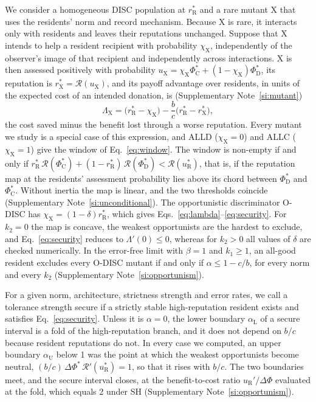 \documentclass[10pt]{wlscirep}
\newcommand{\Rmap}{\mathscr{R}}            %
\newcommand{\rR}{r_{\mathrm{R}}^{*}}
\newcommand{\uR}{u_{\mathrm{R}}^{*}}
\newcommand{\rX}{r_{\mathrm{X}}^{*}}
\newcommand{\uX}{u_{\mathrm{X}}}
\newcommand{\PhiCs}{\Phi^{*}_{\mathrm{C}}}
\newcommand{\PhiDs}{\Phi^{*}_{\mathrm{D}}}
\newcommand{\dPhi}{\Delta\Phi^{*}}
\theoremstyle{plain}
\theoremstyle{remark}
\begin{document}
We consider a homogeneous DISC population at $\rR$ and a rare mutant X that uses the residents' norm and record mechanism. Because X is rare, it interacts only with residents and leaves their reputations unchanged. Suppose that X intends to help a resident recipient with probability $\chi_{\mathrm X}$, independently of the observer's image of that recipient and independently across interactions. X is then assessed positively with probability $\uX=\chi_{\mathrm X}\PhiCs+(1-\chi_{\mathrm X})\PhiDs$, its reputation is $\rX=\Rmap(\uX)$, and its payoff advantage over residents, in units of the expected cost of an intended donation, is (Supplementary Note~\ref{si:mutant})
\begin{equation}
\Lambda_{\mathrm X}=\bigl(\rR-\chi_{\mathrm X}\bigr)-\frac{b}{c}\bigl(\rR-\rX\bigr),
\label{eq:m-mutant}
\end{equation}
the cost saved minus the benefit lost through a worse reputation. Every mutant we study is a special case of this expression, and ALLD ($\chi_{\mathrm X}=0$) and ALLC ($\chi_{\mathrm X}=1$) give the window of Eq.~\eqref{eq:window}. The window is non-empty if and only if $\rR\,\Rmap(\PhiCs)+(1-\rR)\,\Rmap(\PhiDs)<\Rmap(\uR)$, that is, if the reputation map at the residents' assessment probability lies above its chord between $\PhiDs$ and $\PhiCs$. Without inertia the map is linear, and the two thresholds coincide (Supplementary Note~\ref{si:unconditional}). The opportunistic discriminator O-DISC has $\chi_{\mathrm X}=(1-\delta)\rR$, which gives Eqs.~\eqref{eq:lambda}--\eqref{eq:security}. For $k_2=0$ the map is concave, the weakest opportunists are the hardest to exclude, and Eq.~\eqref{eq:security} reduces to $\Lambda'(0)\leq0$, whereas for $k_2>0$ all values of $\delta$ are checked numerically. In the error-free limit with $\beta=1$ and $k_1\geq1$, an all-good resident excludes every O-DISC mutant if and only if $\alpha\leq1-c/b$, for every norm and every $k_2$ (Supplementary Note~\ref{si:opportunism}).

For a given norm, architecture, strictness strength and error rates, we call a tolerance strength secure if a strictly stable high-reputation resident exists and satisfies Eq.~\eqref{eq:security}. Unless it is $\alpha=0$, the lower boundary $\alpha_{\mathrm L}$ of a secure interval is a fold of the high-reputation branch, and it does not depend on $b/c$ because resident reputations do not. In every case we computed, an upper boundary $\alpha_{\mathrm U}$ below 1 was the point at which the weakest opportunists become neutral, $(b/c)\,\dPhi\,\Rmap'(\uR)=1$, so that it rises with $b/c$. The two boundaries meet, and the secure interval closes, at the benefit-to-cost ratio $u_{\mathrm R}'/\Delta\Phi$ evaluated at the fold, which equals 2 under SH (Supplementary Note~\ref{si:opportunism}).
\end{document}
